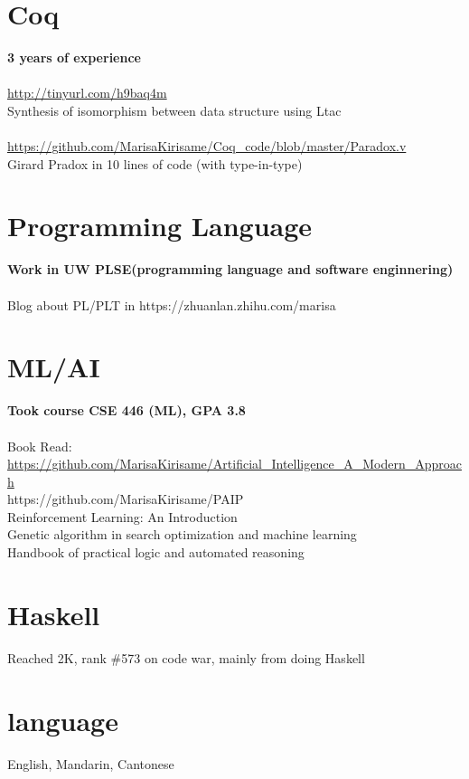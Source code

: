 \documentclass[margin,line]{res}
\begin{document}
\begin{resume}
\section{\sc Coq} 
\textbf{3 years of experience} \\
\\
\url{http://tinyurl.com/h9baq4m} \\
Synthesis of isomorphism between data structure using Ltac \\
\\
\url{https://github.com/MarisaKirisame/Coq_code/blob/master/Paradox.v} \\
Girard Pradox in 10 lines of code (with type-in-type)

\section{\sc Programming Language}
\textbf{Work in UW PLSE(programming language and software enginnering)} \\
\\
Blog about PL/PLT in https://zhuanlan.zhihu.com/marisa

\section{ML/AI}
\textbf{Took course CSE 446 (ML), GPA 3.8} \\
\\
Book Read: \\
\url{https://github.com/MarisaKirisame/Artificial_Intelligence_A_Modern_Approach} \\
https://github.com/MarisaKirisame/PAIP \\
Reinforcement Learning: An Introduction \\
Genetic algorithm in search optimization and machine learning \\
Handbook of practical logic and automated reasoning

\section{\sc Haskell} Reached 2K, rank \#573 on code war, mainly from doing Haskell

\section{\sc language} English, Mandarin, Cantonese

\vspace*{-.2in}

\end{resume}
\end{document}
